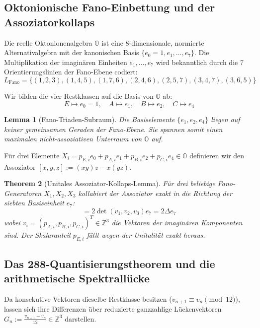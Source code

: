 \documentclass[11pt,a4paper]{article}
\newtheorem{theorem}{Theorem}[section]
\newtheorem{lemma}[theorem]{Lemma}
\begin{document}
\subsection{Oktonionische Fano-Einbettung und der Assoziatorkollaps}

Die reelle Oktonionenalgebra $\mathbb{O}$ ist eine 8-dimensionale, normierte Alternativalgebra mit der kanonischen Basis $\{e_0=1, e_1, \dots, e_7\}$. Die Multiplikation der imaginären Einheiten $e_1, \dots, e_7$ wird bekanntlich durch die 7 Orientierungslinien der Fano-Ebene codiert:
\begin{equation}
L_{\text{Fano}} = \{(1,2,3), (1,4,5), (1,7,6), (2,4,6), (2,5,7), (3,4,7), (3,6,5)\}
\end{equation}

Wir bilden die vier Restklassen auf die Basis von $\mathbb{O}$ ab:
\begin{equation}
E \mapsto e_0 = 1, \quad A \mapsto e_1, \quad B \mapsto e_2, \quad C \mapsto e_4
\end{equation}

\begin{lemma}[Fano-Triaden-Subraum]
Die Basiselemente $\{e_1, e_2, e_4\}$ liegen auf keiner gemeinsamen Geraden der Fano-Ebene. Sie spannen somit einen maximalen nicht-assoziativen Unterraum von $\mathbb{O}$ auf.
\end{lemma}

Für drei Elemente $X_i = p_{E,i}e_0 + p_{A,i}e_1 + p_{B,i}e_2 + p_{C,i}e_4 \in \mathbb{O}$ definieren wir den Assoziator $[x,y,z] := (xy)z - x(yz)$. 

\begin{theorem}[Unitales Assoziator-Kollaps-Lemma]
Für drei beliebige Fano-Generatoren $X_1, X_2, X_3$ kollabiert der Assoziator exakt in die Richtung der siebten Basiseinheit $e_7$:
\begin{equation}
[X_1, X_2, X_3] = 2 \det(v_1, v_2, v_3) e_7 = 2 \Delta e_7
\end{equation}
wobei $v_i = (p_{A,i}, p_{B,i}, p_{C,i})^T \in \mathbb{Z}^3$ die Vektoren der imaginären Komponenten sind. Der Skalaranteil $p_{E,i}$ fällt wegen der Unitalität exakt heraus.
\end{theorem}

\subsection{Das 288-Quantisierungstheorem und die arithmetische Spektrallücke}

Da konsekutive Vektoren dieselbe Restklasse besitzen ($v_{n+1} \equiv v_n \pmod{12}$), lassen sich ihre Differenzen über reduzierte ganzzahlige Lückenvektoren $G_n := \frac{v_{n+1} - v_n}{12} \in \mathbb{Z}^3$ darstellen.
\end{document}
